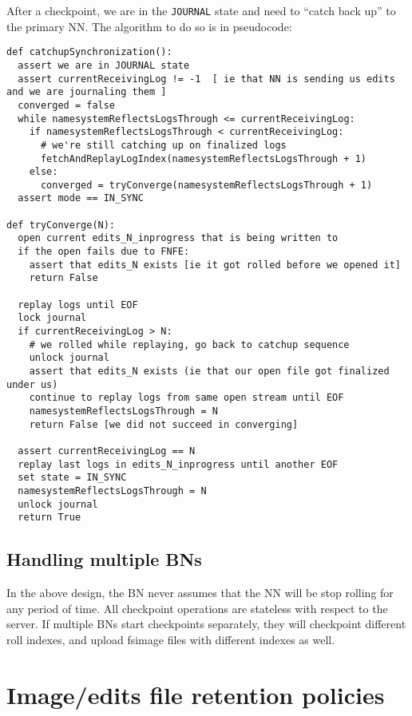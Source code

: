 \documentclass{article}
\begin{document}
After a checkpoint, we are in the {\tt JOURNAL} state and need to ``catch back up'' to the primary NN. The algorithm to do so is in pseudocode:
\label{catchupSynchronization}
\begin{verbatim}
def catchupSynchronization():
  assert we are in JOURNAL state
  assert currentReceivingLog != -1  [ ie that NN is sending us edits and we are journaling them ]
  converged = false
  while namesystemReflectsLogsThrough <= currentReceivingLog:
    if namesystemReflectsLogsThrough < currentReceivingLog:
      # we're still catching up on finalized logs
      fetchAndReplayLogIndex(namesystemReflectsLogsThrough + 1)
    else:
      converged = tryConverge(namesystemReflectsLogsThrough + 1)
  assert mode == IN_SYNC

def tryConverge(N):
  open current edits_N_inprogress that is being written to
  if the open fails due to FNFE:
    assert that edits_N exists [ie it got rolled before we opened it]
    return False

  replay logs until EOF
  lock journal
  if currentReceivingLog > N:
    # we rolled while replaying, go back to catchup sequence
    unlock journal
    assert that edits_N exists (ie that our open file got finalized under us)
    continue to replay logs from same open stream until EOF
    namesystemReflectsLogsThrough = N
    return False [we did not succeed in converging]

  assert currentReceivingLog == N
  replay last logs in edits_N_inprogress until another EOF
  set state = IN_SYNC
  namesystemReflectsLogsThrough = N
  unlock journal
  return True
\end{verbatim}

\subsection{Handling multiple BNs}

In the above design, the BN never assumes that the NN will be stop rolling for any period of time. All checkpoint operations are stateless with respect to the server. If multiple BNs start checkpoints separately, they will checkpoint different roll indexes, and upload fsimage files with different indexes as well.

\section{Image/edits file retention policies}
\end{document}
